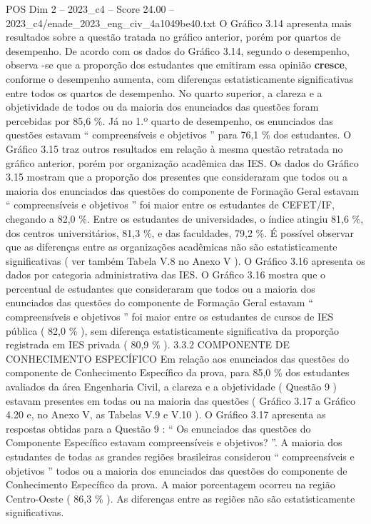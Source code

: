\begin{textsample}{POS Dim 2 – 2023\_c4 – Score 24.00 – 2023\_c4/enade\_2023\_eng\_civ\_4a1049be40.txt}
O Gráfico 3.14 apresenta mais resultados sobre a questão tratada no gráfico anterior, porém por quartos de desempenho.
De acordo com os dados do Gráfico 3.14, segundo o desempenho, observa -se que a proporção dos estudantes que emitiram essa opinião \textbf{cresce}, conforme o desempenho aumenta, com diferenças estatisticamente significativas entre todos os quartos de desempenho.
No quarto superior, a clareza e a objetividade de todos ou da maioria dos enunciados das questões foram percebidas por 85,6 \%.
Já no 1.º quarto de desempenho, os enunciados das questões estavam “ compreensíveis e objetivos ” para 76,1 \% dos estudantes.
O Gráfico 3.15 traz outros resultados em relação à mesma questão retratada no gráfico anterior, porém por organização acadêmica das IES.
Os dados do Gráfico 3.15 mostram que a proporção dos presentes que consideraram que todos ou a maioria dos enunciados das questões do componente de Formação Geral estavam “ compreensíveis e objetivos ” foi maior entre os estudantes de CEFET/IF, chegando a 82,0 \%.
Entre os estudantes de universidades, o índice atingiu 81,6 \%, dos centros universitários, 81,3 \%, e das faculdades, 79,2 \%.
É possível observar que as diferenças entre as organizações acadêmicas não são estatisticamente significativas ( ver também Tabela V.8 no Anexo V ).
O Gráfico 3.16 apresenta os dados por categoria administrativa das IES.
O Gráfico 3.16 mostra que o percentual de estudantes que consideraram que todos ou a maioria dos enunciados das questões do componente de Formação Geral estavam “ compreensíveis e objetivos ” foi maior entre os estudantes de cursos de IES pública ( 82,0 \% ), sem diferença estatisticamente significativa da proporção registrada em IES privada ( 80,9 \% ). 3.3.2 COMPONENTE DE CONHECIMENTO ESPECÍFICO Em relação aos enunciados das questões do componente de Conhecimento Específico da prova, para 85,0 \% dos estudantes avaliados da área Engenharia Civil, a clareza e a objetividade ( Questão 9 ) estavam presentes em todas ou na maioria das questões ( Gráfico 3.17 a Gráfico 4.20 e, no Anexo V, as Tabelas V.9 e V.10 ).
O Gráfico 3.17 apresenta as respostas obtidas para a Questão 9 : “ Os enunciados das questões do Componente Específico estavam compreensíveis e objetivos? ”.
A maioria dos estudantes de todas as grandes regiões brasileiras considerou “ compreensíveis e objetivos ” todos ou a maioria dos enunciados das questões do componente de Conhecimento Específico da prova.
A maior porcentagem ocorreu na região Centro-Oeste ( 86,3 \% ).
As diferenças entre as regiões não são estatisticamente significativas.

\end{textsample}
